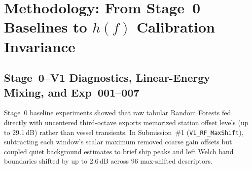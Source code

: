\documentclass[10pt,a4paper]{article}
\begin{document}
\section{Methodology: From Stage~0 Baselines to \texorpdfstring{$h(f)$}{h(f)} Calibration Invariance}

\subsection{Stage~0--V1 Diagnostics, Linear-Energy Mixing, and Exp~001--007}

Stage~0 baseline experiments showed that raw tabular Random Forests \parencite{breiman2001rf} fed directly with uncentered third-octave exports memorized station offset levels (up to 29.1\,dB) rather than vessel transients. In Submission~\#1 (\texttt{V1\_RF\_MaxShift}), subtracting each window's scalar maximum removed coarse gain offsets but coupled quiet background estimates to brief ship peaks and left Welch band boundaries shifted by up to 2.6\,dB across 96 max-shifted descriptors.
\end{document}
